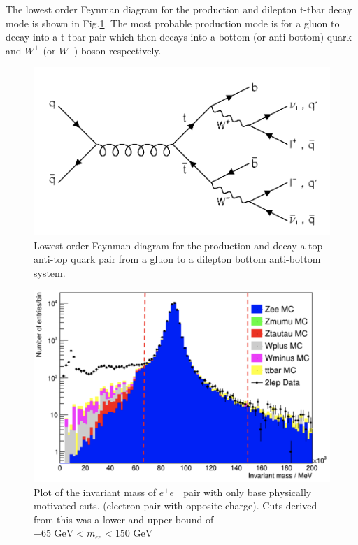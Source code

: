 \documentclass[%
 reprint,
 amsmath,amssymb,
 aps,
]{revtex4-2}
\begin{document}
The lowest order Feynman diagram for the production and dilepton t-tbar decay mode is shown in Fig.\ref{fig:ttbar-dilep}.\cite{PhysRevLett.79.3585} 
The most probable production mode is for a gluon to decay into a t-tbar pair which then decays into a bottom (or anti-bottom) quark and $W^{+}$ (or $W^{-}$) boson respectively.
\begin{figure}
    \centering
    \begin{minipage}{0.4\textwidth}
        \centering
        \includegraphics[width=\linewidth]{feynman/ttbar_decay.pdf}
    \end{minipage}
    \caption{Lowest order Feynman diagram for the production and decay a top anti-top quark pair from a gluon to a dilepton bottom anti-bottom system. \cite{PhysRevLett.79.3585}}
    \label{fig:ttbar-dilep}
\end{figure}
\begin{figure}
    \centering
    \begin{minipage}{0.4\textwidth}
        \centering
        \includegraphics[width=\linewidth]{plots/invar-mass_no-cut_ee_nt.png}
    \end{minipage}
    \caption{Plot of the invariant mass of $e^{+}e^{-}$ pair with only base physically motivated cuts. (electron pair with opposite charge).  Cuts derived from this was a lower and upper bound of $ -65\text{ GeV} < m_{ee} < 150 \text{ GeV}$}
    \label{fig:invar-mass_no-cut_ee}
\end{figure}
\end{document}
